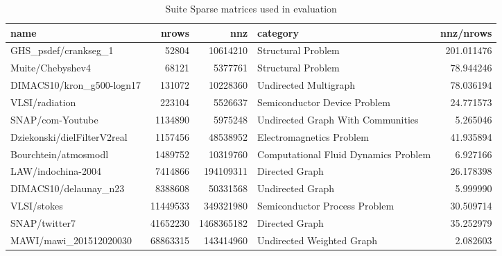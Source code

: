 
\begin{table}[t]
\centering
\caption{Suite Sparse matrices used in evaluation}
\label{tab:suite_sparse_matrices}
\begin{tabular}{lrrlr}
\toprule
name & nrows & nnz & category & nnz/nrows \\
\midrule
GHS\_psdef/crankseg\_1 & 52804 & 10614210 & Structural Problem & 201.011476 \\
Muite/Chebyshev4 & 68121 & 5377761 & Structural Problem & 78.944246 \\
DIMACS10/kron\_g500-logn17 & 131072 & 10228360 & Undirected Multigraph & 78.036194 \\
VLSI/radiation & 223104 & 5526637 & Semiconductor Device Problem & 24.771573 \\
SNAP/com-Youtube & 1134890 & 5975248 & Undirected Graph With Communities & 5.265046 \\
Dziekonski/dielFilterV2real & 1157456 & 48538952 & Electromagnetics Problem & 41.935894 \\
Bourchtein/atmosmodl & 1489752 & 10319760 & Computational Fluid Dynamics Problem & 6.927166 \\
LAW/indochina-2004 & 7414866 & 194109311 & Directed Graph & 26.178398 \\
DIMACS10/delaunay\_n23 & 8388608 & 50331568 & Undirected Graph & 5.999990 \\
VLSI/stokes & 11449533 & 349321980 & Semiconductor Process Problem & 30.509714 \\
SNAP/twitter7 & 41652230 & 1468365182 & Directed Graph & 35.252979 \\
MAWI/mawi\_201512020030 & 68863315 & 143414960 & Undirected Weighted Graph & 2.082603 \\
\bottomrule
\end{tabular}

\end{table}
